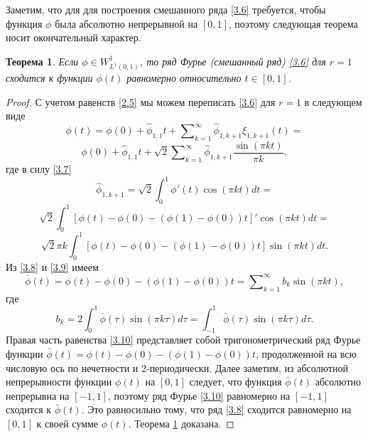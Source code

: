 \documentclass{article}
\numberwithin{equation}{section}
\theoremstyle{plain}
\newtheorem{theorem}{Теорема}
\theoremstyle{definition}
\newtheorem{proof}{Доказательство}\def\theproof{}
\begin{document}
\begin{fulltext}
 Заметим, что для  для построения смешанного ряда \eqref{3.6} требуется, чтобы функция $\phi$ была абсолютно непрерывной на $[0,1]$, поэтому следующая теорема носит окончательный характер.
\begin{theorem}\label{th1}
  Если $\phi\in W^1_{L^1(0,1)}$, то ряд Фурье (смешанный ряд) \eqref{3.6} для $r=1$ сходится к функции $\phi(t)$ равномерно относительно $t\in[0,1]$.
 \end{theorem}
\begin{proof} С учетом равенств \eqref{2.5} мы можем переписать \eqref{3.6} для $r=1$ в следующем виде
$$
\phi(t)= \phi(0)+\hat \phi_{1,1}t+\sum\nolimits_{k=1}^\infty \hat \phi_{1,k+1}\xi_{1,k+1}(t)=
$$
\begin{equation}\label{3.8}
 \phi(0)+\hat \phi_{1,1}t+\sqrt{2} \sum\nolimits_{k=1}^\infty \hat \phi_{1,k+1}\frac{\sin(\pi kt)}{\pi k},
\end{equation}
где  в силу \eqref{3.7}
  $$
\hat \phi_{1,k+1}=\sqrt{2}\int_{0}^1 \phi'(t)\cos(\pi kt)dt=
$$
$$
\sqrt{2}\int_{0}^1 [\phi(t)-\phi(0)-(\phi(1)-\phi(0))t]'\cos(\pi kt)dt=
$$
\begin{equation}\label{3.9}
\sqrt{2}\pi k\int_{0}^1 [\phi(t)-\phi(0)-(\phi(1)-\phi(0))t]\sin(\pi kt)dt.
\end{equation}
Из \eqref{3.8} и  \eqref{3.9} имеем
\begin{equation}\label{3.10}
\bar\phi(t)=\phi(t)-\phi(0)-(\phi(1)-\phi(0))t= \sum\nolimits_{k=1}^\infty b_k\sin(\pi kt),
\end{equation}
где
\begin{equation}\label{3.11}
b_k=2\int_{0}^1 \bar\phi(\tau)\sin(\pi k\tau)d\tau=\int_{-1}^1 \bar\phi(\tau)\sin(\pi k\tau)d\tau.
\end{equation}
Правая часть равенства \eqref{3.10} представляет собой  тригонометрический ряд Фурье функции $\bar\phi(t)=  \phi(t)-\phi(0)-(\phi(1)-\phi(0))t$, продолженной на всю  числовую ось по нечетности и $2$-периодически. Далее заметим, из абсолютной непрерывности функции $\phi(t)$ на $[0,1]$ следует, что функция $\bar\phi(t)$ абсолютно непрерывна на $[-1,1]$, поэтому ряд Фурье \eqref{3.10} равномерно на $[-1,1]$ сходится к $\bar\phi(t)$. Это равносильно тому, что ряд \eqref{3.8}  сходится равномерно на $[0,1]$ к своей сумме $\phi(t)$. Теорема \ref{th1} доказана.
\end{proof}


\end{fulltext}
\end{document}
